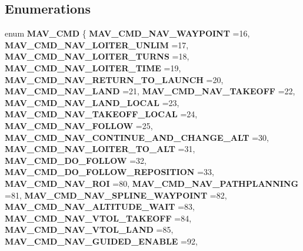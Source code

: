 \subsection*{Enumerations}
\begin{DoxyCompactItemize}
\item 
enum \textbf{ M\+A\+V\+\_\+\+C\+MD} \{ \newline
\textbf{ M\+A\+V\+\_\+\+C\+M\+D\+\_\+\+N\+A\+V\+\_\+\+W\+A\+Y\+P\+O\+I\+NT} =16, 
\textbf{ M\+A\+V\+\_\+\+C\+M\+D\+\_\+\+N\+A\+V\+\_\+\+L\+O\+I\+T\+E\+R\+\_\+\+U\+N\+L\+IM} =17, 
\textbf{ M\+A\+V\+\_\+\+C\+M\+D\+\_\+\+N\+A\+V\+\_\+\+L\+O\+I\+T\+E\+R\+\_\+\+T\+U\+R\+NS} =18, 
\textbf{ M\+A\+V\+\_\+\+C\+M\+D\+\_\+\+N\+A\+V\+\_\+\+L\+O\+I\+T\+E\+R\+\_\+\+T\+I\+ME} =19, 
\newline
\textbf{ M\+A\+V\+\_\+\+C\+M\+D\+\_\+\+N\+A\+V\+\_\+\+R\+E\+T\+U\+R\+N\+\_\+\+T\+O\+\_\+\+L\+A\+U\+N\+CH} =20, 
\textbf{ M\+A\+V\+\_\+\+C\+M\+D\+\_\+\+N\+A\+V\+\_\+\+L\+A\+ND} =21, 
\textbf{ M\+A\+V\+\_\+\+C\+M\+D\+\_\+\+N\+A\+V\+\_\+\+T\+A\+K\+E\+O\+FF} =22, 
\textbf{ M\+A\+V\+\_\+\+C\+M\+D\+\_\+\+N\+A\+V\+\_\+\+L\+A\+N\+D\+\_\+\+L\+O\+C\+AL} =23, 
\newline
\textbf{ M\+A\+V\+\_\+\+C\+M\+D\+\_\+\+N\+A\+V\+\_\+\+T\+A\+K\+E\+O\+F\+F\+\_\+\+L\+O\+C\+AL} =24, 
\textbf{ M\+A\+V\+\_\+\+C\+M\+D\+\_\+\+N\+A\+V\+\_\+\+F\+O\+L\+L\+OW} =25, 
\textbf{ M\+A\+V\+\_\+\+C\+M\+D\+\_\+\+N\+A\+V\+\_\+\+C\+O\+N\+T\+I\+N\+U\+E\+\_\+\+A\+N\+D\+\_\+\+C\+H\+A\+N\+G\+E\+\_\+\+A\+LT} =30, 
\textbf{ M\+A\+V\+\_\+\+C\+M\+D\+\_\+\+N\+A\+V\+\_\+\+L\+O\+I\+T\+E\+R\+\_\+\+T\+O\+\_\+\+A\+LT} =31, 
\newline
\textbf{ M\+A\+V\+\_\+\+C\+M\+D\+\_\+\+D\+O\+\_\+\+F\+O\+L\+L\+OW} =32, 
\textbf{ M\+A\+V\+\_\+\+C\+M\+D\+\_\+\+D\+O\+\_\+\+F\+O\+L\+L\+O\+W\+\_\+\+R\+E\+P\+O\+S\+I\+T\+I\+ON} =33, 
\textbf{ M\+A\+V\+\_\+\+C\+M\+D\+\_\+\+N\+A\+V\+\_\+\+R\+OI} =80, 
\textbf{ M\+A\+V\+\_\+\+C\+M\+D\+\_\+\+N\+A\+V\+\_\+\+P\+A\+T\+H\+P\+L\+A\+N\+N\+I\+NG} =81, 
\newline
\textbf{ M\+A\+V\+\_\+\+C\+M\+D\+\_\+\+N\+A\+V\+\_\+\+S\+P\+L\+I\+N\+E\+\_\+\+W\+A\+Y\+P\+O\+I\+NT} =82, 
\textbf{ M\+A\+V\+\_\+\+C\+M\+D\+\_\+\+N\+A\+V\+\_\+\+A\+L\+T\+I\+T\+U\+D\+E\+\_\+\+W\+A\+IT} =83, 
\textbf{ M\+A\+V\+\_\+\+C\+M\+D\+\_\+\+N\+A\+V\+\_\+\+V\+T\+O\+L\+\_\+\+T\+A\+K\+E\+O\+FF} =84, 
\textbf{ M\+A\+V\+\_\+\+C\+M\+D\+\_\+\+N\+A\+V\+\_\+\+V\+T\+O\+L\+\_\+\+L\+A\+ND} =85, 
\newline
\textbf{ M\+A\+V\+\_\+\+C\+M\+D\+\_\+\+N\+A\+V\+\_\+\+G\+U\+I\+D\+E\+D\+\_\+\+E\+N\+A\+B\+LE} =92, 

\end{DoxyCompactItemize}
